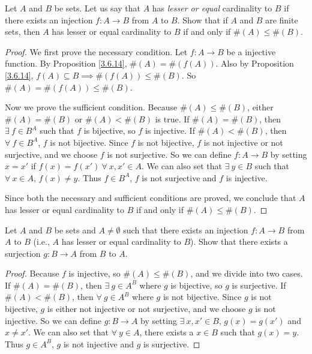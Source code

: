 \begin{exercise}\label{ex 3.6.7}
    Let \(A\) and \(B\) be sets.
    Let us say that \(A\) has \emph{lesser or equal} cardinality to \(B\) if there exists an injection \(f : A \to B\) from \(A\) to \(B\).
    Show that if \(A\) and \(B\) are finite sets, then \(A\) has lesser or equal cardinality to \(B\) if and only if \(\#(A) \leq \#(B)\).
\end{exercise}

\begin{proof}
    We first prove the necessary condition.
    Let \(f : A \to B\) be a injective function.
    By Proposition \ref{3.6.14}, \(\#(A) = \#(f(A))\).
    Also by Proposition \ref{3.6.14}, \(f(A) \subseteq B \implies \#(f(A)) \leq \#(B)\).
    So \(\#(A) = \#(f(A)) \leq \#(B)\).

    Now we prove the sufficient condition.
    Because \(\#(A) \leq \#(B)\), either \(\#(A) = \#(B)\) or \(\#(A) < \#(B)\) is true.
    If \(\#(A) = \#(B)\), then \(\exists\ f \in B^A\) such that \(f\) is bijective, so \(f\) is injective.
    If \(\#(A) < \#(B)\), then \(\forall\ f \in B^A\), \(f\) is not bijective.
    Since \(f\) is not bijective, \(f\) is not injective or not surjective, and we choose \(f\) is not surjective.
    So we can define  \(f : A \to B\) by setting \(x = x'\) if \(f(x) = f(x') \ \forall\ x, x' \in A\).
    We can also set that \(\exists\ y \in B\) such that \(\forall\ x \in A\), \(f(x) \neq y\).
    Thus \(f \in B^A\), \(f\) is not surjective and \(f\) is injective.

    Since both the necessary and sufficient conditions are proved, we conclude that \(A\) has lesser or equal cardinality to \(B\) if and only if \(\#(A) \leq \#(B)\).
\end{proof}

\begin{exercise}\label{ex 3.6.8}
    Let \(A\) and \(B\) be sets and \(A \neq \emptyset\) such that there exists an injection \(f : A \to B\) from \(A\) to \(B\) (i.e., \(A\) has lesser or equal cardinality to \(B\)).
    Show that there exists a surjection \(g : B \to A\) from \(B\) to \(A\).
\end{exercise}

\begin{proof}
    Because \(f\) is injective, so \(\#(A) \leq \#(B)\), and we divide into two cases.
    If \(\#(A) = \#(B)\), then \(\exists\ g \in A^B\) where \(g\) is bijective, so \(g\) is surjective.
    If \(\#(A) < \#(B)\), then \(\forall\ g \in A^B\) where \(g\) is not bijective.
    Since \(g\) is not bijective, \(g\) is either not injective or not surjective, and we choose \(g\) is not injective.
    So we can define \(g : B \to A\) by setting \(\exists\ x, x' \in B\), \(g(x) = g(x')\) and \(x \neq x'\).
    We can also set that \(\forall\ y \in A\), there exists a \(x \in B\) such that \(g(x) = y\).
    Thus \(g \in A^B\), \(g\) is not injective and \(g\) is surjective.
\end{proof}

